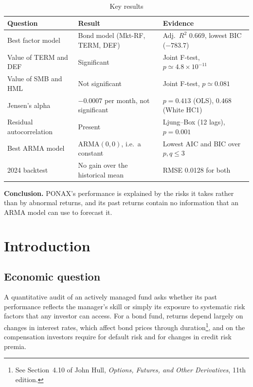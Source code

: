 \documentclass[11pt,a4paper]{article}
\begin{document}
\begin{table}[H]
\centering
\caption{Key results}
\footnotesize
\setlength{\tabcolsep}{4pt}
\begin{tabular}{lll}
\toprule
Question & Result & Evidence \\
\midrule
Best factor model & Bond model (Mkt-RF, TERM, DEF) & Adj.\ $R^2$ 0.669, lowest BIC ($-783.7$) \\
Value of TERM and DEF & Significant & Joint F-test, $p \simeq 4.8 \times 10^{-11}$ \\
Value of SMB and HML & Not significant & Joint F-test, $p \simeq 0.081$ \\
Jensen's alpha & $-0.0007$ per month, not significant & $p = 0.413$ (OLS), $0.468$ (White HC1) \\
Residual autocorrelation & Present & Ljung--Box (12 lags), $p = 0.001$ \\
Best ARMA model & ARMA$(0,0)$, i.e.\ a constant & Lowest AIC and BIC over $p, q \le 3$ \\
2024 backtest & No gain over the historical mean & RMSE 0.0128 for both \\
\bottomrule
\end{tabular}
\end{table}

\textbf{Conclusion.} PONAX's performance is explained by the risks it takes rather than by abnormal returns, and its past returns contain no information that an ARMA model can use to forecast it.

\newpage
\setcounter{tocdepth}{1}
\tableofcontents
\bigskip

\section{Introduction}

\subsection{Economic question}

A quantitative audit of an actively managed fund asks whether its past performance reflects the manager's skill or simply its exposure to systematic risk factors that any investor can access. For a bond fund, returns depend largely on changes in interest rates, which affect bond prices through duration\footnote{See Section~4.10 of John Hull, \emph{Options, Futures, and Other Derivatives}, 11th edition.}, and on the compensation investors require for default risk and for changes in credit risk premia.
\end{document}
